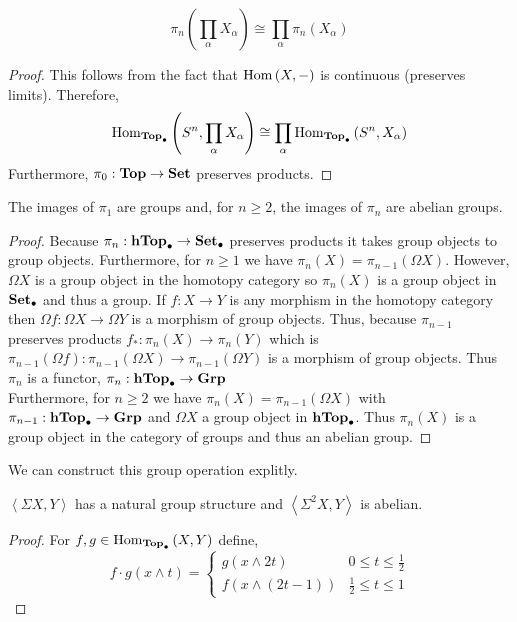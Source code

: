 \documentclass[12pt]{extarticle}
\begin{document}
\begin{proposition}
\[\pi_n \left( \prod_\alpha X_\alpha \right) \cong \prod_{\alpha} \pi_n(X_\alpha)\]
\end{proposition}

\begin{proof}
This follows from the fact that $\mathrm{Hom}\left( X, - \right)$ is continuous (preserves limits). Therefore,
\[ \mathrm{Hom}_{\mathbf{Top}_{\bullet}}\left( S^n, \prod_{\alpha} X_{\alpha} \right) \cong \prod_{\alpha} \mathrm{Hom}_{\mathbf{Top}_{\bullet}}\left( S^n, X_{\alpha} \right) \]
Furthermore, $\pi_0 : \mathbf{Top} \to \mathbf{Set}$ preserves products. 
\end{proof}

\begin{proposition}
The images of $\pi_1$ are groups and, for $n \ge 2$, the images of $\pi_n$ are abelian groups. 
\end{proposition}

\begin{proof}
Because $\pi_n : \mathbf{hTop}_{\bullet} \to \mathbf{Set}_\bullet$ preserves products it takes group objects to group objects. Furthermore, for $n \ge 1$ we have $\pi_n(X) = \pi_{n-1}(\Omega X)$. However, $\Omega X$ is a group object in the homotopy category so $\pi_n(X)$ is a group object in $\mathbf{Set}_\bullet$ and thus a group. If $f : X \to Y$ is any morphism in the homotopy category then $\Omega f : \Omega X \to \Omega Y$ is a morphism of group objects. Thus, because $\pi_{n-1}$ preserves products $f_* : \pi_n(X) \to \pi_n(Y)$ which is $\pi_{n-1}(\Omega f) : \pi_{n-1}(\Omega X) \to \pi_{n-1}(\Omega Y)$ is a morphism of group objects. Thus $\pi_n$ is a functor, $\pi_n : \mathbf{hTop}_{\bullet} \to \mathbf{Grp}$
\bigskip\\
Furthermore, for $n \ge 2$ we have $\pi_n(X) = \pi_{n-1}(\Omega X)$ with $\pi_{n-1} : \mathbf{hTop}_{\bullet} \to \mathbf{Grp}$ and $\Omega X$ a group object in $\mathbf{hTop}_{\bullet}$. Thus $\pi_n(X)$ is a group object in the category of groups and thus an abelian group. 
\end{proof}

\begin{remark}
We can construct this group operation explitly.
\end{remark}

\begin{proposition}
$\left< \Sigma X, Y \right>$ has a natural group structure and $\left< \Sigma^2 X, Y \right>$ is abelian.
\end{proposition}

\begin{proof}
For $f,g \in \mathrm{Hom}_{\mathbf{Top}_{\bullet}}\left( X, Y \right)$ define, 
\[f \cdot g(x \wedge t) = 
\begin{cases}
g(x \wedge 2t) & 0 \le t \le \tfrac{1}{2} \\
f(x \wedge (2t - 1)) & \tfrac{1}{2} \le t \le 1
\end{cases}\]
\end{proof}
\end{document}
